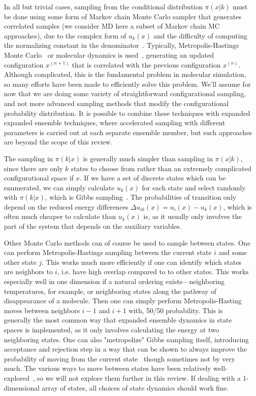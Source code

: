 \documentclass[superscriptaddress,showkeys, nofootinbib, pre, aps]{revtex4-1}
\begin{document}
In all but trivial cases, sampling from the conditional distribution $\pi(x | k)$ must be done using some form of Markov chain Monte Carlo sampler that generates correlated samples (we consider MD here a subset of Markov chain MC approaches), due to the complex form of $u_k(x)$ and the difficulty of computing the normalizing constant in
the denominator~\cite{jun-s-liu:mcmc}. Typically, Metropolis-Hastings
Monte Carlo~\cite{metropolis:jcp:1953:metropolis-monte-carlo,hastings:biometrika:1970:metropolis-hastings}
or molecular dynamics is used~\cite{footnote3}, generating an updated
configuration $x^{(n+1)}$ that is correlated with the previous
configuration $x^{(n)}$.  Although complicated, this is the fundamental problem in molecular simulation, so many efforts have been made to efficiently solve this problem.  We'll assume for now that we are doing some variety of straightforward configurational sampling, and not more advanced sampling methods that modify the configurational probability distribution. It is possible to combine these techniques with expanded expanded ensemble techniques, where accelerated sampling with different parameters is carried out at each separate ensemble member, but such approaches are beyond the scope of this review.

The sampling in $\pi(k|x)$ is generally much simpler than sampling in $\pi(x|k) $, since there are only $k$ states to choose from rather than an extremely complicated configurational space if $x$.  If we have a set of  discrete states which can be enumerated, we can simply calculate $u_k(x)$ for each state and select randomly with $\pi(k|x)$, which is Gibbs sampling~\cite{chodera:jcp:2011}. The probabilities of transition only depend on the reduced energy differences $\Delta u_{ik}(x) = u_i(x) - u_k(x)$, which is often much cheaper to calculate than $u_k(x)$ is, as it usually only involves the part of the system that depends on the auxiliary variables.

Other Monte Carlo methods can of course be used to sample between states.  One can perform Metropolis-Hastings sampling between the current state $i$ and some other state $j$. This works much more efficiently if one can identify which states are neighbors to $i$, i.e. have high overlap compared to to other states. This works especially well in one dimension if a natural ordering exists---neighboring temperatures, for example, or neighboring states along the pathway of disappearance of a molecule. Then one can simply perform Metropolis-Hasting moves between neighbors $i-1$ and $i+1$ with, 50/50 probability.  This is generally the most common way that expanded ensemble dynamics in state spaces is implemented, as it only involves calculating the energy at two neighboring states. One can also "metropolize" Gibbs sampling itself, introducing acceptance and rejection step in a way that can be shown to always improve the probability of moving from the current state~\cite{chodera:jcp:2011} though sometimes not by very much. The various ways to move between states have been relatively well-explored~\cite{chodera:jcp:2011}, so we will not explore them further in this review. If dealing with a 1-dimensional array of states, all choices of state dynamics should work fine.
\end{document}
